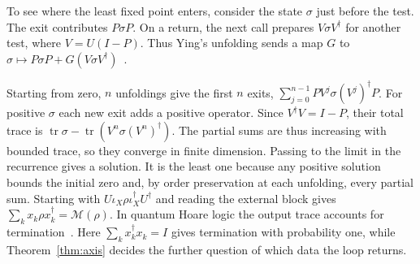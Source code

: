 \documentclass[acmsmall,screen,review,anonymous,nonacm]{acmart}
\newcommand{\tr}{\operatorname{tr}}
\numberwithin{equation}{section}
\newcommand{\meas}{\mathcal M}
\begin{document}
To see where the least fixed point enters, consider the state $\sigma$
just before the test. The exit contributes $P\sigma P$. On a return,
the next call prepares $V\sigma V^\dagger$ for another test, where
$V=U(I-P)$. Thus Ying's unfolding sends a map $G$ to
$\sigma\mapsto P\sigma P+G(V\sigma V^\dagger)$~\cite[arXiv v1, Prop.~5.1(6), Cor.~5.1]{Ying11Hoare}.

Starting from zero, $n$ unfoldings give the first $n$ exits,
$\sum_{j=0}^{n-1}PV^j\sigma(V^j)^\dagger P$. For positive $\sigma$
each new exit adds a positive operator. Since $V^\dagger V=I-P$,
their total trace is $\tr\sigma-\tr(V^n\sigma(V^n)^\dagger)$.
The partial sums are thus increasing with bounded trace, so they
converge in finite dimension. Passing to the limit in the recurrence
gives a solution. It is the least one because any positive solution
bounds the initial zero and, by order preservation at each unfolding,
every partial sum. Starting with
$U\iota_X\rho\iota_X^\dagger U^\dagger$ and reading the external
block gives $\sum_k x_k\rho x_k^\dagger=\meas(\rho)$. In quantum Hoare logic the output trace accounts for termination~\cite{Ying11Hoare}. Here $\sum_k x_k^\dagger x_k=I$ gives termination with probability one, while Theorem~\ref{thm:axis} decides the further question of which data the loop returns.
\end{document}
